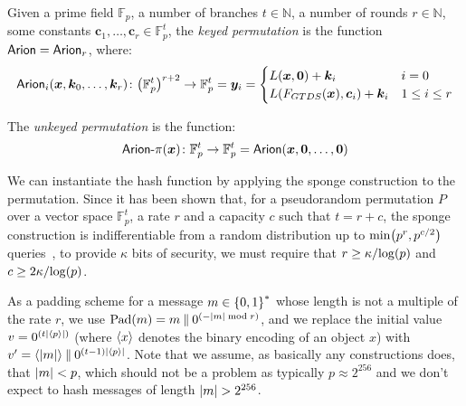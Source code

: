 \begin{definition}
  Given a prime field \(\mathbb{F}_p\), a number of branches \(t \in \mathbb{N}\), a number 
  of rounds \(r \in \mathbb{N}\), some constants \(\bm{c}_1, \dots, \bm{c}_r \in \mathbb{F}_p^t\), 
  the \emph{\Arion{} keyed permutation} is the function \(\Arion = \Arion_r\), where:
  \[
    \call{\Arion_i}{\bm{x}, \bm{k}_0, \dots, \bm{k}_r}\colon 
      \Parens*{\mathbb{F}_p^t}^{r+2} \to \mathbb{F}_p^t = \bm{y}_i =
      \begin{cases}
        \call{L}{\bm{x}, \bm{0}} + \bm{k}_i & i = 0 \\
        \call{L}{\call{F_{GTDS}}{\bm{x}}, \bm{c}_i} + \bm{k}_i & 1 \le i \le r
      \end{cases}
  \]
\end{definition}

\begin{definition}
  The \emph{\Arion{} unkeyed permutation} is the function:
  \[
    \call{\Arionp}{\bm{x}}\colon \mathbb{F}_p^t \to \mathbb{F}_p^t = 
      \call{\Arion}{\bm{x}, \bm{0}, \dots, \bm{0}}
  \]
\end{definition}

We can instantiate the hash function \Arionhash{} by applying the sponge construction to 
the \Arionp{} permutation.
Since it has been shown that, for a pseudorandom permutation \(P\) over a vector space 
\(\mathbb{F}_p^{t}\), a rate \(r\) and a capacity 
\(c\) such that \(t = r + c\), the sponge construction is indifferentiable from a random 
distribution up to \(\call{\min}{p^r, p^{c/2}}\) queries~\cite{BertoniDPV2008}, to provide 
\(\kappa \) bits of security, we must require that \(r \ge {\kappa}/{\call{\log}{p}}\) and 
\(c \ge {2\kappa}/{\call{\log}{p}}\).

As a padding scheme for a message \(m \in \Set{0, 1}^*\) whose length is not a multiple of the rate 
\(r\), we use \(\call{\Pad}{m} = m \concat 0^{\Parens*{-\abs{m} \bmod r}}\), and we replace the 
initial value \(v = 0^{\Parens*{t\abs{\Encode{p}}}}\) (where \(\Encode{x}\) denotes the binary 
encoding of an object \(x\)) with 
\(v' = \Encode{\abs{m}} \concat 0^{\Parens*{t-1}\abs{\Encode{p}}}\).
Note that we assume,  as basically any constructions does, that \(\abs{m} < p\), 
which should not be a problem as typically \(p \approx 2^{256}\) and we don't expect to hash 
messages of length \(\abs{m} > 2^{256}\).

